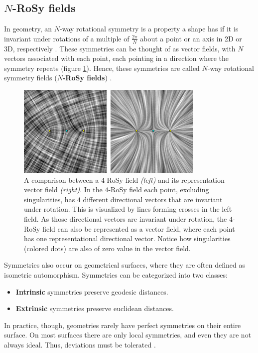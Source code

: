 \documentclass{ACGSeminar}
\begin{document}
\subsection{$N$-RoSy fields}\label{rosy}
In geometry, an $N$-way rotational symmetry is a property a shape has if it is invariant under rotations of a multiple of $\frac{2\pi}{N}$ about a point or an axis in 2D or 3D, respectively \cite{palacios2007rotational}. These symmetries can be thought of as vector fields, with $N$ vectors associated with each point, each pointing in a direction where the symmetry repeats (figure \ref{fig:n-rosy-singularities}). Hence, these symmetries are called $N$-way rotational symmetry fields (\textbf{$N$-RoSy fields}) \cite{panozzo2012fields}.

\begin{figure}[htb!]
	\begin{centering}
		\includegraphics[width=9cm]{img/n-Rosy-Singularity.png}\par
	\end{centering}
	\caption{A comparison between a $4$-RoSy field \textit{(left)} and its representation vector field \textit{(right)}. In the $4$-RoSy field each point, excluding singularities, has $4$ different directional vectors that are invariant under rotation. This is visualized by lines forming crosses in the left field. As those directional vectors are invariant under rotation, the $4$-RoSy field can also be represented as a vector field, where each point has one representational directional vector. Notice how singularities (colored dots) are also of zero value in the vector field. \cite{palacios2007rotational}}
	\label{fig:n-rosy-singularities}
\end{figure}

Symmetries also occur on geometrical surfaces, where they are often defined as isometric automorphism. Symmetries can be categorized into two classes:
\begin{itemize}
	\item	\textbf{Intrinsic} symmetries preserve geodesic distances.
	\item	\textbf{Extrinsic} symmetries preserve euclidean distances.
\end{itemize}
In practice, though, geometries rarely have perfect symmetries on their entire surface. On most surfaces there are only local symmetries, and even they are not always ideal. Thus, deviations must be tolerated \cite{panozzo2012fields}.\bigskip
\end{document}
